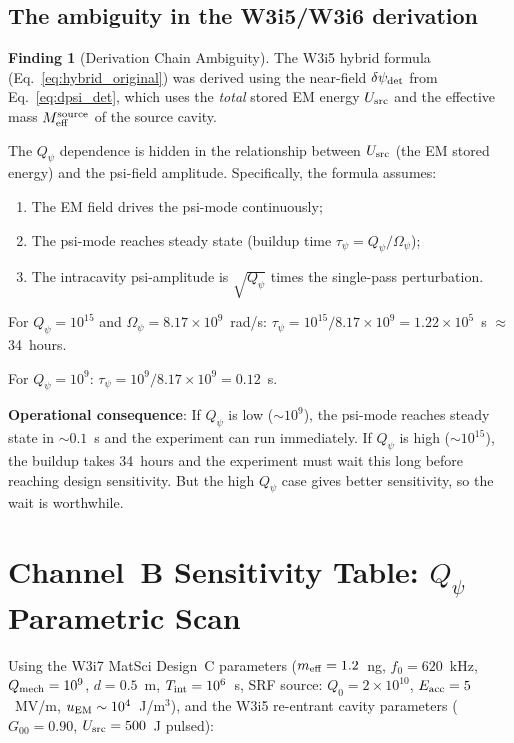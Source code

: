 \documentclass[11pt]{article}
\newcommand{\dpsi}{\delta\psi}
\newcommand{\Opsi}{\Omega_\psi}
\newcommand{\Meff}{M_{\rm eff}}
\newcommand{\ee}[1]{\times 10^{#1}}
\newcommand{\Qpsi}{Q_\psi}
\newcommand{\Qmech}{Q_{\rm mech}}
\theoremstyle{definition}
\newtheorem{finding}[theorem]{Finding}
\theoremstyle{remark}
\begin{document}
\subsection{The ambiguity in the W3i5/W3i6 derivation}

\begin{finding}[Derivation Chain Ambiguity]
\label{find:derivation_ambiguity}
The W3i5 hybrid formula (Eq.~\eqref{eq:hybrid_original}) was derived
using the near-field $\dpsi_{\rm det}$ from Eq.~\eqref{eq:dpsi_det},
which uses the \emph{total} stored EM energy $U_{\rm src}$ and the
effective mass $\Meff^{\rm source}$ of the source cavity.

The $\Qpsi$ dependence is hidden in the relationship between
$U_{\rm src}$ (the EM stored energy) and the psi-field amplitude.
Specifically, the formula assumes:
\begin{enumerate}[nosep]
\item The EM field drives the psi-mode continuously;
\item The psi-mode reaches steady state (buildup time
  $\tau_\psi = \Qpsi/\Opsi$);
\item The intracavity psi-amplitude is $\sqrt{\Qpsi}$ times the
  single-pass perturbation.
\end{enumerate}

For $\Qpsi = 10^{15}$ and $\Opsi = 8.17\ee{9}$~rad/s:
$\tau_\psi = 10^{15}/8.17\ee{9} = 1.22\ee{5}$~s $\approx$ 34~hours.

For $\Qpsi = 10^{9}$: $\tau_\psi = 10^{9}/8.17\ee{9} = 0.12$~s.

\textbf{Operational consequence}: If $\Qpsi$ is low ($\sim 10^9$), the
psi-mode reaches steady state in $\sim 0.1$~s and the experiment can
run immediately. If $\Qpsi$ is high ($\sim 10^{15}$), the buildup
takes 34~hours and the experiment must wait this long before reaching
design sensitivity. But the high $\Qpsi$ case gives better sensitivity,
so the wait is worthwhile.
\end{finding}


\section{Channel~B Sensitivity Table: $\Qpsi$ Parametric Scan}
\label{sec:parametric_scan}

Using the W3i7 MatSci Design~C parameters ($m_{\rm eff} = 1.2$~ng,
$f_0 = 620$~kHz, $\Qmech = 10^9$, $d = 0.5$~m, $T_{\rm int} = 10^6$~s,
SRF source: $Q_0 = 2\ee{10}$, $E_{\rm acc} = 5$~MV/m,
$u_{\rm EM} \sim 10^4$~J/m$^3$), and the W3i5 re-entrant cavity parameters
($G_{00} = 0.90$, $U_{\rm src} = 500$~J pulsed):
\end{document}
